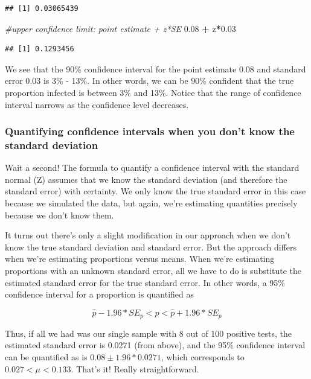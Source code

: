 \documentclass[
]{book}
\newenvironment{Shaded}{\begin{snugshade}}{\end{snugshade}}
\newcommand{\CommentTok}[1]{\textcolor[rgb]{0.56,0.35,0.01}{\textit{#1}}}
\newcommand{\FloatTok}[1]{\textcolor[rgb]{0.00,0.00,0.81}{#1}}
\newcommand{\NormalTok}[1]{#1}
\newcommand{\SpecialCharTok}[1]{\textcolor[rgb]{0.81,0.36,0.00}{\textbf{#1}}}
\begin{document}
\begin{verbatim}
## [1] 0.03065439
\end{verbatim}

\begin{Shaded}
\begin{Highlighting}[]
\CommentTok{\#upper confidence limit: point estimate + z*SE}
\FloatTok{0.08} \SpecialCharTok{+}\NormalTok{ z}\SpecialCharTok{*}\FloatTok{0.03}
\end{Highlighting}
\end{Shaded}

\begin{verbatim}
## [1] 0.1293456
\end{verbatim}

We see that the 90\% confidence interval for the point estimate 0.08 and standard error 0.03 is 3\% - 13\%. In other words, we can be 90\% confident that the true proportion infected is between 3\% and 13\%. Notice that the range of confidence interval narrows as the confidence level decreases.

\subsubsection{Quantifying confidence intervals when you don't know the standard deviation}\label{quantifying-confidence-intervals-when-you-dont-know-the-standard-deviation}

Wait a second! The formula to quantify a confidence interval with the standard normal (Z) assumes that we know the standard deviation (and therefore the standard error) with certainty. We only know the true standard error in this case because we simulated the data, but again, we're estimating quantities precisely because we don't know them.

It turns out there's only a slight modification in our approach when we don't know the true standard deviation and standard error. But the approach differs when we're estimating proportions versus means. When we're estimating proportions with an unknown standard error, all we have to do is substitute the estimated standard error for the true standard error. In other words, a 95\% confidence interval for a proportion is quantified as

\[
\hat{p} -1.96*SE_{\hat{p}} < p < \hat{p} +1.96*SE_{\hat{p}}
\]

Thus, if all we had was our single sample with 8 out of 100 positive tests, the estimated standard error is 0.0271 (from above), and the 95\% confidence interval can be quantified as is \(0.08\pm 1.96*0.0271\), which corresponds to \(0.027 < \mu < 0.133\). That's it! Really straightforward.
\end{document}
